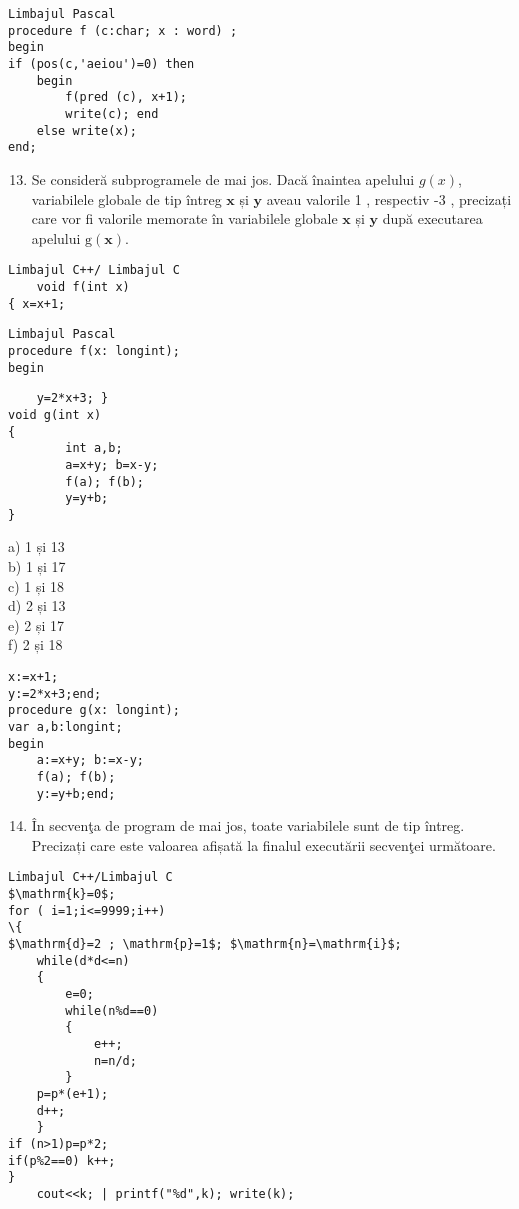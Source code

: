 \begin{verbatim}
Limbajul Pascal
procedure f (c:char; x : word) ;
begin
if (pos(c,'aeiou')=0) then
    begin
        f(pred (c), x+1);
        write(c); end
    else write(x);
end;
\end{verbatim}

\begin{enumerate}
  \setcounter{enumi}{12}
  \item Se consideră subprogramele de mai jos. Dacă înaintea apelului $g(x)$, variabilele globale de tip întreg $\mathbf{x}$ și $\mathbf{y}$ aveau valorile 1 , respectiv -3 , precizați care vor fi valorile memorate în variabilele globale $\mathbf{x}$ și $\mathbf{y}$ după executarea apelului $\mathrm{g}(\mathbf{x})$.
\end{enumerate}

\begin{verbatim}
Limbajul C++/ Limbajul C
    void f(int x)
{ x=x+1;
\end{verbatim}

\begin{verbatim}
Limbajul Pascal
procedure f(x: longint);
begin
\end{verbatim}

\begin{verbatim}
    y=2*x+3; }
void g(int x)
{
        int a,b;
        a=x+y; b=x-y;
        f(a); f(b);
        y=y+b;
}
\end{verbatim}

a) 1 și 13\\
b) 1 și 17\\
c) 1 și 18\\
d) 2 și 13\\
e) 2 și 17\\
f) 2 și 18

\begin{verbatim}
x:=x+1;
y:=2*x+3;end;
procedure g(x: longint);
var a,b:longint;
begin
    a:=x+y; b:=x-y;
    f(a); f(b);
    y:=y+b;end;
\end{verbatim}

\begin{enumerate}
  \setcounter{enumi}{13}
  \item În secvenţa de program de mai jos, toate variabilele sunt de tip întreg. Precizați care este valoarea afișată la finalul executării secvenţei următoare.
\end{enumerate}

\begin{verbatim}
Limbajul C++/Limbajul C
$\mathrm{k}=0$;
for ( i=1;i<=9999;i++)
\{
$\mathrm{d}=2 ; \mathrm{p}=1$; $\mathrm{n}=\mathrm{i}$;
    while(d*d<=n)
    {
        e=0;
        while(n%d==0)
        {
            e++;
            n=n/d;
        }
    p=p*(e+1);
    d++;
    }
if (n>1)p=p*2;
if(p%2==0) k++;
}
    cout<<k; | printf("%d",k); write(k);
\end{verbatim}

